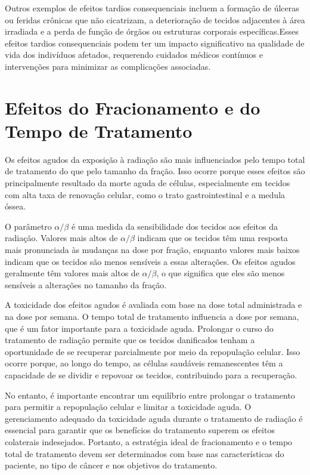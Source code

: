 \documentclass[11pt,a4paper]{article}
\newcounter{exemplo}
\begin{document}
	Outros exemplos de efeitos tardios consequenciais incluem a formação de úlceras ou feridas crônicas que não cicatrizam, a deterioração de tecidos adjacentes à área irradiada e a perda de função de órgãos ou estruturas corporais específicas.Esses efeitos tardios consequenciais podem ter um impacto significativo na qualidade de vida dos indivíduos afetados, requerendo cuidados médicos contínuos e intervenções para minimizar as complicações associadas.

\section{Efeitos do Fracionamento e do Tempo de Tratamento}

	Os efeitos agudos da exposição à radiação são mais influenciados pelo tempo total de tratamento do que pelo tamanho da fração. Isso ocorre porque esses efeitos são principalmente resultado da morte aguda de células, especialmente em tecidos com alta taxa de renovação celular, como o trato gastrointestinal e a medula óssea.

	O parâmetro $\alpha/\beta$ é uma medida da sensibilidade dos tecidos aos efeitos da radiação. Valores mais altos de $\alpha/\beta$ indicam que os tecidos têm uma resposta mais pronunciada às mudanças na dose por fração, enquanto valores mais baixos indicam que os tecidos são menos sensíveis a essas alterações. Os efeitos agudos geralmente têm valores mais altos de $\alpha/\beta$, o que significa que eles são menos sensíveis a alterações no tamanho da fração.

	A toxicidade dos efeitos agudos é avaliada com base na dose total administrada e na dose por semana. O tempo total de tratamento influencia a dose por semana, que é um fator importante para a toxicidade aguda. Prolongar o curso do tratamento de radiação permite que os tecidos danificados tenham a oportunidade de se recuperar parcialmente por meio da repopulação celular. Isso ocorre porque, ao longo do tempo, as células saudáveis remanescentes têm a capacidade de se dividir e repovoar os tecidos, contribuindo para a recuperação.

	No entanto, é importante encontrar um equilíbrio entre prolongar o tratamento para permitir a repopulação celular e limitar a toxicidade aguda. O gerenciamento adequado da toxicidade aguda durante o tratamento de radiação é essencial para garantir que os benefícios do tratamento superem os efeitos colaterais indesejados. Portanto, a estratégia ideal de fracionamento e o tempo total de tratamento devem ser determinados com base nas características do paciente, no tipo de câncer e nos objetivos do tratamento.
\end{document}
